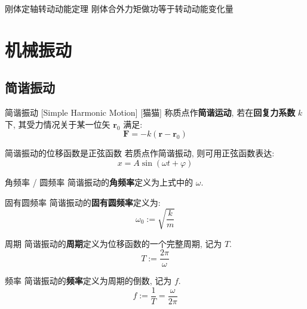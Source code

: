 \documentclass[UTF8]{ctexart}
\begin{document}
            \begin{thm}
                {刚体定轴转动动能定理}
                刚体合外力矩做功等于转动动能变化量
            \end{thm}

    \section{机械振动}

        \subsection{简谐振动}
            
            \begin{dfn}
                []
                {简谐振动}
                [Simple Harmonic Motion]
                [猫猫]
                称质点作\textbf{简谐运动}, 若在\textbf{回复力系数} \(k\) 下, 其受力情况关于某一位矢 \(\bm{r}_0\) 满足: 
                \[\bm{F}=-k(\bm{r}-\bm{r}_0)\]
            \end{dfn}
            
            \begin{thm}
                {简谐振动的位移函数是正弦函数}
                若质点作简谐振动, 则可用正弦函数表达: 
                \[x=A\sin(\omega t+\varphi)\]
            \end{thm}
            
            \begin{dfn}
                {角频率 / 圆频率}
                简谐振动的\textbf{角频率}定义为上式中的 \(\omega\). 
            \end{dfn}
            
            \begin{dfn}
                {固有圆频率}
                简谐振动的\textbf{固有圆频率}定义为: 
                \[\omega_0:=\sqrt{\frac{k}{m}}\]
            \end{dfn}
            
            \begin{dfn}
                {周期}
                简谐振动的\textbf{周期}定义为位移函数的一个完整周期, 记为 \(T\). 
                \[T:=\frac{2\pi}{\omega}\]
            \end{dfn}
            
            \begin{dfn}
                {频率}
                简谐振动的\textbf{频率}定义为周期的倒数, 记为 \(f\). 
                \[f:=\frac{1}{T}=\frac{\omega}{2\pi}\]
            \end{dfn}
            
\end{document}
